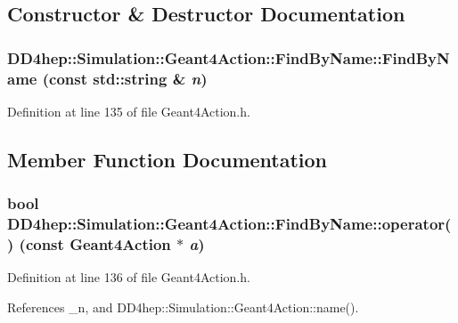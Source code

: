 \subsection{Constructor \& Destructor Documentation}
\hypertarget{struct_d_d4hep_1_1_simulation_1_1_geant4_action_1_1_find_by_name_a731d979b2f54aaeb1f99d6c3723681d0}{
\subsubsection[{FindByName}]{\setlength{\rightskip}{0pt plus 5cm}DD4hep::Simulation::Geant4Action::FindByName::FindByName (const std::string \& {\em n})}}
\label{struct_d_d4hep_1_1_simulation_1_1_geant4_action_1_1_find_by_name_a731d979b2f54aaeb1f99d6c3723681d0}


Definition at line 135 of file Geant4Action.h.

\subsection{Member Function Documentation}
\hypertarget{struct_d_d4hep_1_1_simulation_1_1_geant4_action_1_1_find_by_name_add22afec2f12ebc3ead57df3694de5e5}{
\subsubsection[{operator()}]{\setlength{\rightskip}{0pt plus 5cm}bool DD4hep::Simulation::Geant4Action::FindByName::operator() (const {\bf Geant4Action} $\ast$ {\em a})}}
\label{struct_d_d4hep_1_1_simulation_1_1_geant4_action_1_1_find_by_name_add22afec2f12ebc3ead57df3694de5e5}


Definition at line 136 of file Geant4Action.h.

References \_\-n, and DD4hep::Simulation::Geant4Action::name().

